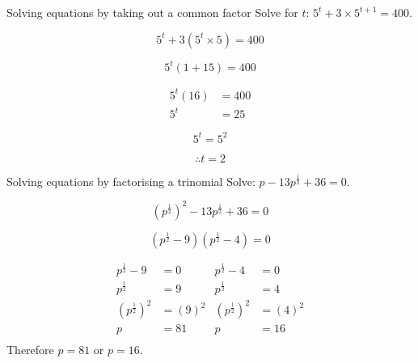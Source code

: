\begin{wex}{Solving equations by taking out a common factor}
{Solve for $t$: $5^t + 3 \times 5^{t+1} = 400$.}
{
\begin{equation*}
  5^t + 3 ( 5^t \times 5) = 400 
\end{equation*}

\begin{equation*}
 5^t(1 + 15) = 400 
\end{equation*}


\begin{align*}
 5^t(16) &= 400 \\
  5^t &= 25 
\end{align*}


\begin{equation*}
  5^t = 5^2 
\end{equation*}


\begin{equation*}
\therefore t = 2
\end{equation*}
}
\end{wex}

\begin{wex}
{Solving equations by factorising a trinomial}
{Solve: $ p-13 p^{\frac{1}{2}} + 36 =  0$.}
{

$$ (p^{\frac{1}{2}})^2 -13p^{\frac{1}{2}} + 36 = 0 $$


$$ (p^{\frac{1}{2}} -9)(p^{\frac{1}{2}}-4) = 0 $$


\begin{align*}
p^{\frac{1}{2}} - 9 &= 0			&   p^{\frac{1}{2}} - 4 &= 0		\\
p^{\frac{1}{2}} &= 9				&   p^{\frac{1}{2}} &= 4		\\		
(p^{\frac{1}{2}})^2 &= (9)^2			&   (p^{\frac{1}{2}})^2 &= (4)^2\\
p &= 81				&   p &= 16\\
\end{align*} 
Therefore $p=81$ or $p=16$.
}
\end{wex}

